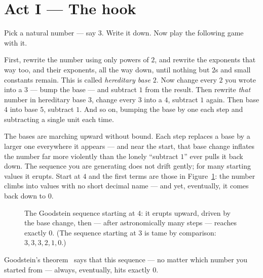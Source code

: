 \documentclass[11pt]{article}
\begin{document}
\section{Act I --- The hook}

Pick a natural number --- say $3$. Write it down. Now play the following
game with it.

First, rewrite the number using only powers of $2$, and rewrite the
exponents that way too, and their exponents, all the way down, until nothing
but $2$s and small constants remain. This is called \emph{hereditary base
$2$}. Now change every $2$ you wrote into a $3$ --- bump the base --- and
subtract $1$ from the result. Then rewrite \emph{that} number in hereditary
base $3$, change every $3$ into a $4$, subtract $1$ again. Then base $4$ into
base $5$, subtract $1$. And so on, bumping the base by one each step and
subtracting a single unit each time.

The bases are marching upward without bound. Each step replaces a base by a
larger one everywhere it appears --- and near the start, that base change
inflates the number far more violently than the lonely ``subtract $1$'' ever
pulls it back down. The sequence you are generating does not drift gently;
for many starting values it erupts. Start at $4$ and the first terms are
those in Figure~\ref{fig:erupt}: the number climbs into values with no short
decimal name --- and yet, eventually, it comes back down to $0$.

\begin{figure}[h]
\centering
{}
\caption{The Goodstein sequence starting at $4$: it erupts upward, driven by
the base change, then --- after astronomically many steps --- reaches
exactly $0$. (The sequence starting at $3$ is tame by comparison:
$3,3,3,2,1,0$.)}
\label{fig:erupt}
\end{figure}

Goodstein's theorem~\citep{goodstein1944} says that this sequence --- no matter
which number you started from --- always, eventually, hits exactly $0$.
\end{document}
